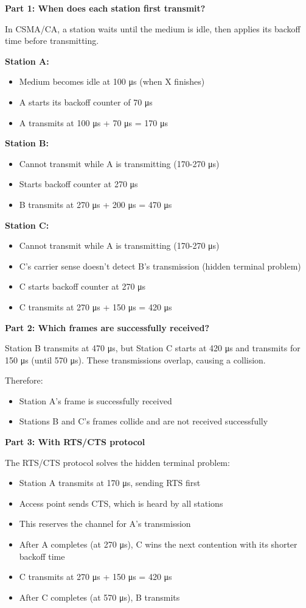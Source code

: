 \documentclass[11pt,a4paper]{article}
\begin{document}
\textbf{Part 1: When does each station first transmit?}

In CSMA/CA, a station waits until the medium is idle, then applies its backoff time before transmitting.

\textbf{Station A:}
\begin{itemize}
    \item Medium becomes idle at 100 μs (when X finishes)
    \item A starts its backoff counter of 70 μs
    \item A transmits at 100 μs + 70 μs = 170 μs
\end{itemize}

\textbf{Station B:}
\begin{itemize}
    \item Cannot transmit while A is transmitting (170-270 μs)
    \item Starts backoff counter at 270 μs
    \item B transmits at 270 μs + 200 μs = 470 μs
\end{itemize}

\textbf{Station C:}
\begin{itemize}
    \item Cannot transmit while A is transmitting (170-270 μs)
    \item C's carrier sense doesn't detect B's transmission (hidden terminal problem)
    \item C starts backoff counter at 270 μs
    \item C transmits at 270 μs + 150 μs = 420 μs
\end{itemize}

\textbf{Part 2: Which frames are successfully received?}

Station B transmits at 470 μs, but Station C starts at 420 μs and transmits for 150 μs (until 570 μs). These transmissions overlap, causing a collision.

Therefore:
\begin{itemize}
    \item Station A's frame is successfully received
    \item Stations B and C's frames collide and are not received successfully
\end{itemize}

\textbf{Part 3: With RTS/CTS protocol}

The RTS/CTS protocol solves the hidden terminal problem:

\begin{itemize}
    \item Station A transmits at 170 μs, sending RTS first
    \item Access point sends CTS, which is heard by all stations
    \item This reserves the channel for A's transmission
    \item After A completes (at 270 μs), C wins the next contention with its shorter backoff time
    \item C transmits at 270 μs + 150 μs = 420 μs
    \item After C completes (at 570 μs), B transmits
\end{itemize}
\end{document}
